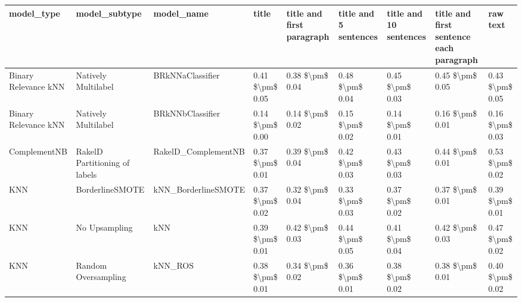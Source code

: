 \begin{tabular}{lllllllll}
\toprule
                     model\_type &                 model\_subtype &                                   model\_name &           title & title and first paragraph & title and 5 sentences & title and 10 sentences & title and first sentence each paragraph &            raw text \\
\midrule
           Binary Relevance kNN &           Natively Multilabel &                             BRkNNaClassifier & 0.41 \$\textbackslash pm\$ 0.05 &           0.38 \$\textbackslash pm\$ 0.04 &       0.48 \$\textbackslash pm\$ 0.04 &        0.45 \$\textbackslash pm\$ 0.03 &                         0.45 \$\textbackslash pm\$ 0.05 &     0.43 \$\textbackslash pm\$ 0.05 \\
           Binary Relevance kNN &           Natively Multilabel &                             BRkNNbClassifier & 0.14 \$\textbackslash pm\$ 0.00 &           0.14 \$\textbackslash pm\$ 0.02 &       0.15 \$\textbackslash pm\$ 0.02 &        0.14 \$\textbackslash pm\$ 0.01 &                         0.16 \$\textbackslash pm\$ 0.01 &     0.16 \$\textbackslash pm\$ 0.03 \\
                   ComplementNB & RakelD Partitioning of labels &                          RakelD\_ComplementNB & 0.37 \$\textbackslash pm\$ 0.01 &           0.39 \$\textbackslash pm\$ 0.04 &       0.42 \$\textbackslash pm\$ 0.03 &        0.43 \$\textbackslash pm\$ 0.03 &                         0.44 \$\textbackslash pm\$ 0.01 &     0.53 \$\textbackslash pm\$ 0.02 \\
                            KNN &               BorderlineSMOTE &                          kNN\_BorderlineSMOTE & 0.37 \$\textbackslash pm\$ 0.02 &           0.32 \$\textbackslash pm\$ 0.04 &       0.33 \$\textbackslash pm\$ 0.03 &        0.37 \$\textbackslash pm\$ 0.02 &                         0.37 \$\textbackslash pm\$ 0.01 &     0.39 \$\textbackslash pm\$ 0.01 \\
                            KNN &                 No Upsampling &                                          kNN & 0.39 \$\textbackslash pm\$ 0.01 &           0.42 \$\textbackslash pm\$ 0.03 &       0.44 \$\textbackslash pm\$ 0.05 &        0.41 \$\textbackslash pm\$ 0.04 &                         0.42 \$\textbackslash pm\$ 0.03 &     0.47 \$\textbackslash pm\$ 0.02 \\
                            KNN &           Random Oversampling &                                      kNN\_ROS & 0.38 \$\textbackslash pm\$ 0.01 &           0.34 \$\textbackslash pm\$ 0.02 &       0.36 \$\textbackslash pm\$ 0.01 &        0.38 \$\textbackslash pm\$ 0.02 &                         0.38 \$\textbackslash pm\$ 0.01 &     0.40 \$\textbackslash pm\$ 0.02 \\

\end{tabular}
